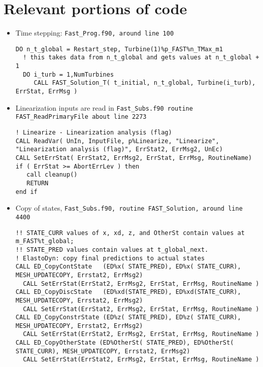 \documentclass[11pt]{article}
\begin{document}
% 









\section{Relevant portions of code}
\fortran
\begin{itemize}
    \item Time stepping: \tt{Fast\_Prog.f90}, around line 100 
\begin{lstlisting}
DO n_t_global = Restart_step, Turbine(1)%p_FAST%n_TMax_m1 
  ! this takes data from n_t_global and gets values at n_t_global + 1
  DO i_turb = 1,NumTurbines
     CALL FAST_Solution_T( t_initial, n_t_global, Turbine(i_turb), ErrStat, ErrMsg )
 \end{lstlisting}

\item Linearization inputs are read in \tt{Fast\_Subs.f90} routine \tt{FAST\_ReadPrimaryFile} about line 2273

\begin{lstlisting}
! Linearize - Linearization analysis (flag)
CALL ReadVar( UnIn, InputFile, p%Linearize, "Linearize", "Linearization analysis (flag)", ErrStat2, ErrMsg2, UnEc)
CALL SetErrStat( ErrStat2, ErrMsg2, ErrStat, ErrMsg, RoutineName)
if ( ErrStat >= AbortErrLev ) then
   call cleanup()
   RETURN        
end if      
\end{lstlisting}

\item Copy of states, \tt{Fast\_Subs.f90}, routine \tt{FAST\_Solution}, around line 4400
\begin{lstlisting}
!! STATE_CURR values of x, xd, z, and OtherSt contain values at m_FAST%t_global;
!! STATE_PRED values contain values at t_global_next.
! ElastoDyn: copy final predictions to actual states
CALL ED_CopyContState   (ED%x( STATE_PRED), ED%x( STATE_CURR), MESH_UPDATECOPY, Errstat2, ErrMsg2)
  CALL SetErrStat(ErrStat2, ErrMsg2, ErrStat, ErrMsg, RoutineName )
CALL ED_CopyDiscState   (ED%xd(STATE_PRED), ED%xd(STATE_CURR), MESH_UPDATECOPY, Errstat2, ErrMsg2)  
  CALL SetErrStat(ErrStat2, ErrMsg2, ErrStat, ErrMsg, RoutineName )
CALL ED_CopyConstrState (ED%z( STATE_PRED), ED%z( STATE_CURR), MESH_UPDATECOPY, Errstat2, ErrMsg2)      
  CALL SetErrStat(ErrStat2, ErrMsg2, ErrStat, ErrMsg, RoutineName )
CALL ED_CopyOtherState (ED%OtherSt( STATE_PRED), ED%OtherSt( STATE_CURR), MESH_UPDATECOPY, Errstat2, ErrMsg2)      
  CALL SetErrStat(ErrStat2, ErrMsg2, ErrStat, ErrMsg, RoutineName )
 \end{lstlisting}
      

\end{itemize}
\end{document}

